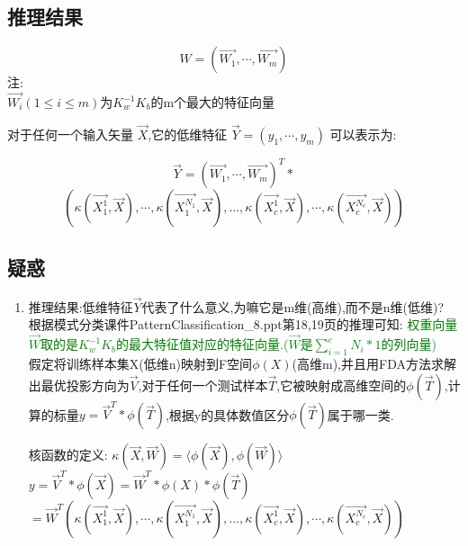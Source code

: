 \documentclass[12pt,a4paper,CJK]{beamer}
\begin{document}
\begin{CJK*}{UTF8}{gkai}
\subsection{推理结果}
\begin{frame}{\subsecname}
	\begin{displaybox}{90mm}
		\[ 			
 			W = (\vec{W_1},\cdots,\vec{W_m})			
 		\]
 		注:\\
 		$\vec{W_i}(1 \leq i \leq m)$为$K_w^{-1}K_b$的m个最大的特征向量 		
 	\end{displaybox}
对于任何一个输入矢量 $\vec{X}$,它的低维特征 $\vec{Y} = ( y_1,\cdots, y_m)$ 可以表示为:
	\begin{displaybox}{120mm}
		\[ 			
 			\vec{Y} = (\vec{W_1},\cdots,\vec{W_m})^T*
 			\]\[(\kappa(\vec{X_1^1},\vec{X}),\cdots,\kappa(\vec{X_1^{N_1}},\vec{X}),\ldots,\kappa(\vec{X_c^1},\vec{X}),\cdots,\kappa(\vec{X_c^{N_c}},\vec{X}))			
 		\]
 	\end{displaybox}



\end{frame}


\subsection{疑惑}
\begin{frame}{\subsecname}
\begin{enumerate}
\item 推理结果:低维特征$\vec{Y}$代表了什么意义,为嘛它是m维(高维),而不是n维(低维)?\\
根据模式分类课件PatternClassification\_{}8.ppt第18,19页的推理可知:
\textcolor{green}{权重向量$\vec{W}$取的是$K_w^{-1}K_b$的最大特征值对应的特征向量.($\vec{W}$是$\sum_{i=1}^{c}N_i*1$的列向量)}\\
假定将训练样本集X(低维n)映射到F空间$\phi(X)$(高维m),并且用FDA方法求解出最优投影方向为$\vec{V}$,对于任何一个测试样本$\vec{T}$,它被映射成高维空间的$\phi(\vec{T})$,计算的标量$y=\vec{V}^T*\phi(\vec{T})$,根据y的具体数值区分$\phi(\vec{T})$属于哪一类.\cite{1}\\
\begin{displaybox}{115mm}
	核函数的定义: \quad $\kappa(\vec{X},\vec{W}) =\langle \phi(\vec{X}),\phi(\vec{W})\rangle$\\
	$y=\vec{V}^T*\phi(\vec{X})=\vec{W}^T*\phi(X)*\phi(\vec{T})$\\
	\qquad $=\vec{W}^T(\kappa(\vec{X_1^1},\vec{X}),\cdots,\kappa(\vec{X_1^{N_1}},\vec{X}),\ldots,\kappa(\vec{X_c^1},\vec{X}),\cdots,\kappa(\vec{X_c^{N_c}},\vec{X}))$
		

\end{displaybox}
\end{enumerate}
\end{frame}
\end{CJK*}
\end{document}
